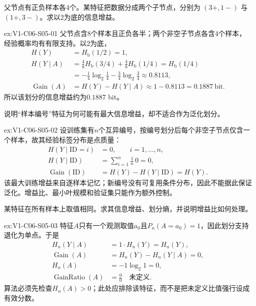 \begin{SLChapterExercisePairSection}
\begin{exercise}\label{ex:V1-C06-S05-01}
父节点有正负样本各4个。某特征把数据分成两个子节点，分别为 $(3+,1-)$ 与 $(1+,3-)$。求以2为底的信息增益。
\end{exercise}
\label{sol:V1-C06-S05-01}
\begin{chapterexercisesolution}{ex:V1-C06-S05-01}
父节点含8个样本且正负各半；两个非空子节点各含4个样本，经验概率均有有限支持。以2为底，
\[
\begin{aligned}
H(Y)&=H_{\mathrm b}(1/2)=1,\\
H(Y\mid A)
&=\frac48H_{\mathrm b}(3/4)+\frac48H_{\mathrm b}(1/4)
=H_{\mathrm b}(1/4)\\
&=-\frac14\log_2\frac14-\frac34\log_2\frac34
\approx0.8113,\\
\operatorname{Gain}(A)
&=H(Y)-H(Y\mid A)\approx1-0.8113=0.1887\ \text{bit}.
\end{aligned}
\]
所以该划分的信息增益约为$0.1887$ bit。
\end{chapterexercisesolution}

\begin{exercise}\label{ex:V1-C06-S05-02}
说明“样本编号”特征为何可能有最大信息增益，却不适合作为泛化划分。
\end{exercise}
\label{sol:V1-C06-S05-02}
\begin{chapterexercisesolution}{ex:V1-C06-S05-02}
设训练集有$n$个互异编号，按编号划分后每个非空子节点仅含一个样本，故其经验标签分布是点质量：
\[
\begin{aligned}
H(Y\mid \mathrm{ID}=i)&=0,\qquad i=1,\ldots,n,\\
H(Y\mid\mathrm{ID})
&=\sum_{i=1}^n\frac1n\,0=0,\\
\operatorname{Gain}(\mathrm{ID})
&=H(Y)-H(Y\mid\mathrm{ID})=H(Y).
\end{aligned}
\]
该最大训练增益来自逐样本记忆；新编号没有可复用条件分布，因此不能据此保证泛化。增益比、最小叶规模和验证集只能作为额外控制。
\end{chapterexercisesolution}

\begin{exercise}\label{ex:V1-C06-S05-03}
某特征在所有样本上取值相同。求其信息增益、划分熵，并说明增益比如何处理。
\end{exercise}
\label{sol:V1-C06-S05-03}
\begin{chapterexercisesolution}{ex:V1-C06-S05-03}
特征$A$只有一个观测取值$a_0$且$P_n(A=a_0)=1$，因此划分支持退化为单点。于是
\[
\begin{aligned}
H_n(Y\mid A)&=1\cdot H_n(Y)=H_n(Y),\\
\operatorname{Gain}(A)&=H_n(Y)-H_n(Y\mid A)=0,\\
H_n(A)&=-1\log_2 1=0,\\
\operatorname{GainRatio}(A)&=\frac{0}{0}\quad\text{未定义}.
\end{aligned}
\]
算法必须先检查$H_n(A)>0$；此处应排除该特征，而不是把未定义比值强行设成有效分数。
\end{chapterexercisesolution}


\end{SLChapterExercisePairSection}
